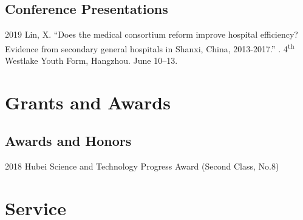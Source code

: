 \documentclass[12pt,letterpaper]{report}
\begin{document}
    
    
    \subsection*{Conference Presentations}
		\begin{tablist}
		
        \item[2019] \tab Lin, X. \enquote{Does the medical consortium reform improve hospital efficiency? Evidence from secondary general hospitals in Shanxi, China, 2013-2017.} . 4\textsuperscript{th} Westlake Youth Form, Hangzhou. June 10--13. 
            
    	\end{tablist}



    \section*{Grants and Awards}

    \subsection*{Awards and Honors}

    \begin{tablist}
      
        \item[2018] \tab Hubei Science and Technology Progress Award (Second Class, No.8)

     \end{tablist}



        

   
    \section*{Service}
\end{document}
